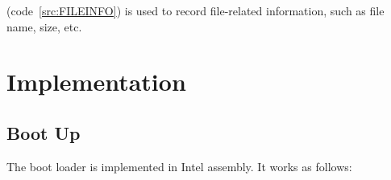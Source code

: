 \documentclass{swfcthesis}
\begin{document}
(code~\ref{src:FILEINFO}) is used to record file-related information, such as file name, size,
etc.
\fi %


    




\chapter{Implementation}

\section{Boot Up}
\label{sec:boot-up-1}

The boot loader is implemented in Intel assembly. It works as follows:
\end{document}
